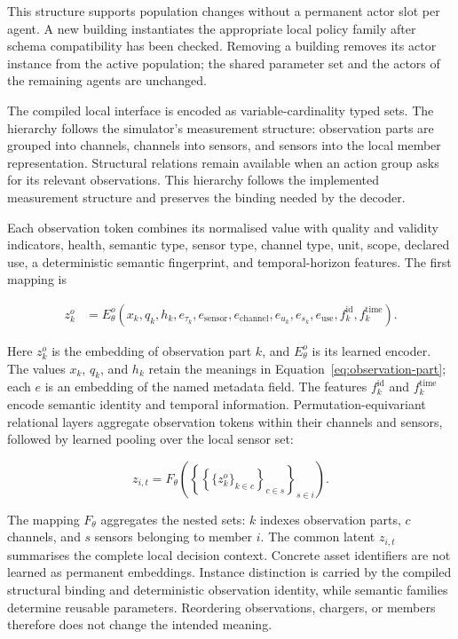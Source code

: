 This structure supports population changes without a permanent actor slot per agent. A new building instantiates the appropriate local policy family after schema compatibility has been checked. Removing a building removes its actor instance from the active population; the shared parameter set and the actors of the remaining agents are unchanged.

\label{sec:timarl-local-encoder}

The compiled local interface is encoded as variable-cardinality typed sets. The hierarchy follows the simulator's measurement structure: observation parts are grouped into channels, channels into sensors, and sensors into the local member representation. Structural relations remain available when an action group asks for its relevant observations. This hierarchy follows the implemented measurement structure and preserves the binding needed by the decoder.

Each observation token combines its normalised value with quality and validity indicators, health, semantic type, sensor type, channel type, unit, scope, declared use, a deterministic semantic fingerprint, and temporal-horizon features. The first mapping is

\begin{align}
z^{o}_{k}
&=
E^{o}_{\theta}
\left(
x_k,q_k,h_k,e_{\tau_k},e_{\mathrm{sensor}},e_{\mathrm{channel}},
e_{u_k},e_{s_k},e_{\mathrm{use}},f^{\mathrm{id}}_k,f^{\mathrm{time}}_k
\right).
\end{align}

Here $z^o_k$ is the embedding of observation part $k$, and $E^o_\theta$ is its learned encoder. The values $x_k$, $q_k$, and $h_k$ retain the meanings in Equation~\ref{eq:observation-part}; each $e$ is an embedding of the named metadata field. The features $f^{\mathrm{id}}_k$ and $f^{\mathrm{time}}_k$ encode semantic identity and temporal information. Permutation-equivariant relational layers aggregate observation tokens within their channels and sensors, followed by learned pooling over the local sensor set:

\begin{equation}
z_{i,t}
=
F_{\theta}
\left(
\left\{\left\{\{z^o_k\}_{k\in c}\right\}_{c\in s}\right\}_{s\in i}
\right).
\label{eq:tip-encoder}
\end{equation}

The mapping $F_\theta$ aggregates the nested sets: $k$ indexes observation parts, $c$ channels, and $s$ sensors belonging to member $i$. The common latent $z_{i,t}$ summarises the complete local decision context. Concrete asset identifiers are not learned as permanent embeddings. Instance distinction is carried by the compiled structural binding and deterministic observation identity, while semantic families determine reusable parameters. Reordering observations, chargers, or members therefore does not change the intended meaning.

